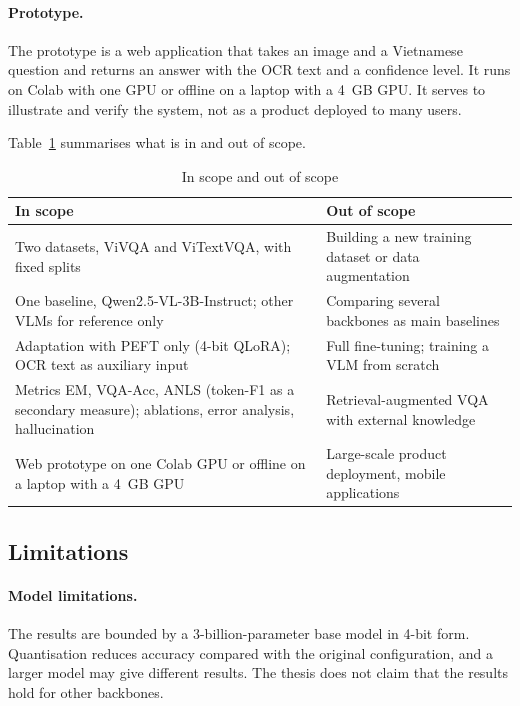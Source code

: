 \paragraph{Prototype.} The prototype is a web application that takes an image and a
Vietnamese question and returns an answer with the OCR text and a confidence level. It
runs on Colab with one GPU or offline on a laptop with a 4~GB GPU. It serves to
illustrate and verify the system, not as a product deployed to many users.

Table~\ref{tab:scope} summarises what is in and out of scope.

\begin{table}[htbp]
\caption{In scope and out of scope}
\label{tab:scope}
\centering
\small
\begin{tabular}{p{}p{}}
\toprule
\textbf{In scope} & \textbf{Out of scope} \\
\midrule
Two datasets, ViVQA and ViTextVQA, with fixed splits &
Building a new training dataset or data augmentation \\
One baseline, Qwen2.5-VL-3B-Instruct; other VLMs for reference only &
Comparing several backbones as main baselines \\
Adaptation with PEFT only (4-bit QLoRA); OCR text as auxiliary input &
Full fine-tuning; training a VLM from scratch \\
Metrics EM, VQA-Acc, ANLS (token-F1 as a secondary measure); ablations, error
analysis, hallucination & Retrieval-augmented VQA with external knowledge \\
Web prototype on one Colab GPU or offline on a laptop with a 4~GB GPU &
Large-scale product deployment, mobile applications \\
\bottomrule
\end{tabular}
\end{table}

\subsection{Limitations}

\paragraph{Model limitations.} The results are bounded by a 3-billion-parameter base
model in 4-bit form. Quantisation reduces accuracy compared with the original
configuration, and a larger model may give different results. The thesis does not
claim that the results hold for other backbones.


